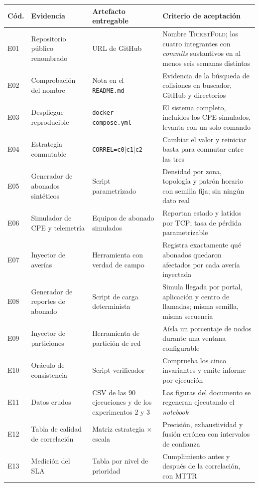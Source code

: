 \documentclass[11pt,a4paper]{article}
\begin{document}
\begin{center}
	\footnotesize
	\begin{longtable}{@{}p{0.9cm}p{4.6cm}p{4.2cm}p{5.0cm}@{}}
		\toprule
		\textbf{Cód.} & \textbf{Evidencia} & \textbf{Artefacto entregable} & \textbf{Criterio de aceptación} \\
		\midrule
		\endhead
		E01 & Repositorio público renombrado & URL de GitHub & Nombre \textsc{TicketFold}; los cuatro integrantes con \emph{commits} sustantivos en al menos seis semanas distintas \\
		E02 & Comprobación del nombre & Nota en el \texttt{README.md} & Evidencia de la búsqueda de colisiones en buscador, GitHub y directorios \\
		E03 & Despliegue reproducible & \texttt{docker-compose.yml} & El sistema completo, incluidos los CPE simulados, levanta con un solo comando \\
		E04 & Estrategia conmutable & \texttt{CORREL=c0$\mid$c1$\mid$c2} & Cambiar el valor y reiniciar basta para conmutar entre las tres \\
		E05 & Generador de abonados sintéticos & Script parametrizado & Densidad por zona, topología y patrón horario con semilla fija; sin ningún dato real \\
		E06 & Simulador de CPE y telemetría & Equipos de abonado simulados & Reportan estado y latidos por TCP; tasa de pérdida parametrizable \\
		E07 & Inyector de averías & Herramienta con verdad de campo & Registra exactamente qué abonados quedaron afectados por cada avería inyectada \\
		E08 & Generador de reportes de abonado & Script de carga determinista & Simula llegada por portal, aplicación y centro de llamadas; misma semilla, misma secuencia \\
		E09 & Inyector de particiones & Herramienta de partición de red & Aísla un porcentaje de nodos durante una ventana configurable \\
		E10 & Oráculo de consistencia & Script verificador & Comprueba los cinco invariantes y emite informe por ejecución \\
		E11 & Datos crudos & CSV de las 90 ejecuciones y de los experimentos 2 y 3 & Las figuras del documento se regeneran ejecutando el \emph{notebook} \\
		E12 & Tabla de calidad de correlación & Matriz estrategia $\times$ escala & Precisión, exhaustividad y fusión errónea con intervalos de confianza \\
		E13 & Medición del SLA & Tabla por nivel de prioridad & Cumplimiento antes y después de la correlación, con MTTR \\

\end{longtable}
\end{center}
\end{document}

